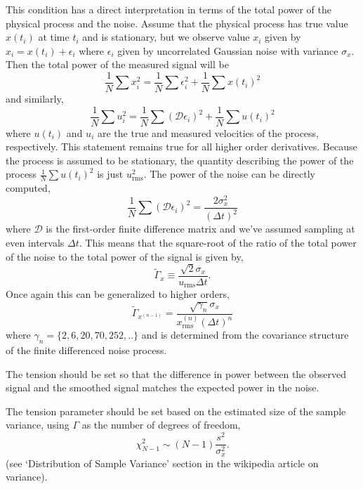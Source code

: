 \documentclass[twocol]{ametsoc}
\begin{document}
This condition has a direct interpretation in terms of the total power of the physical process and the noise. Assume that the physical process has true value $x(t_i)$ at time $t_i$ and is stationary, but we observe value $x_i$ given by $x_i = x(t_i) + \epsilon_i$ where $\epsilon_i$ given by uncorrelated Gaussian noise with variance $\sigma_x$. Then the total power of the measured signal will be
\begin{equation}
 \frac{1}{N} \sum x_i^2 = \frac{1}{N} \sum \epsilon_i^2 + \frac{1}{N} \sum x(t_i)^2
\end{equation}
and similarly,
\begin{equation}
 \frac{1}{N} \sum u_i^2 = \frac{1}{N} \sum \left(\mathcal{D} \epsilon_i\right)^2 + \frac{1}{N} \sum u(t_i)^2
\end{equation}
where $u(t_i)$ and $u_i$ are the true and measured velocities of the process, respectively. This statement remains true for all higher order derivatives. Because the process is assumed to be stationary, the quantity describing the power of the process $\frac{1}{N} \sum u(t_i)^2$ is just $u_{\textrm{rms}}^2$. The power of the noise can be directly computed,
\begin{equation}
\frac{1}{N} \sum \left(\mathcal{D} \epsilon_i\right)^2 = \frac{2 \sigma_x^2}{(\Delta t)^2}
\end{equation}
where $\mathcal{D}$ is the first-order finite difference matrix and we've assumed sampling at even intervals $\Delta t$. This means that the square-root of the ratio of the total power of the noise to the total power of the signal is given by,
\begin{equation}
\tilde{\Gamma}_x \equiv \frac{\sqrt{2} \sigma_x}{u_{\textrm{rms}}\Delta t}.
\end{equation}
Once again this can be generalized to higher orders,
\begin{equation}
\tilde{\Gamma}_{x^{(n-1)}} = \frac{ \sqrt{\gamma_n} \sigma_x}{x^{(n)}_{\textrm{rms}} (\Delta t)^n }
\end{equation}
where $\gamma_n=\{2,6,20,70,252,..\}$ and is determined from the covariance structure of the finite differenced noise process.

The tension should be set so that the difference in power between the observed signal and the smoothed signal matches the expected power in the noise.

The tension parameter should be set based on the estimated size of the sample variance, using $\Gamma$ as the number of degrees of freedom,
\begin{equation}
\chi^2_{N-1} \sim (N-1) \frac{s^2}{\sigma_x^2}.
\end{equation}
(see `Distribution of Sample Variance' section in the wikipedia article on variance).
\end{document}
